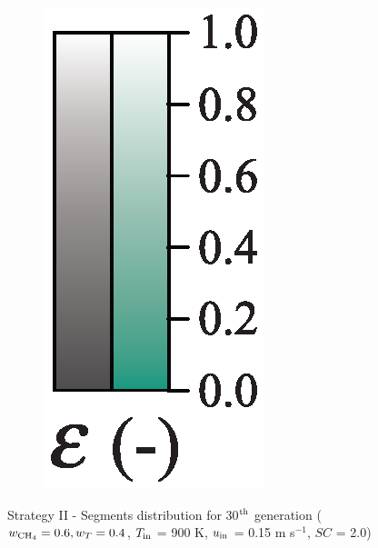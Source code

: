 \documentclass[preprint,12pt]{elsarticle}
\begin{document}
\begin{figure}
\begin{subfigure}[b]{0.1\textwidth}
     	\includegraphics[width=\textwidth]{segments_porosity.eps}
     \end{subfigure}
\caption{\label{fig:30L6040G1-TField} Strategy II - Segments distribution for 30$^{\rm{th}}$ generation ($w_{\rm{CH_4}} = 0.6, w_T = 0.4$, $T_{\rm{in}}$ = 900 K, $u_{\rm{in}}$ = 0.15 m s$^{-1}$, $SC$ = 2.0)}
\end{figure}
\end{document}
